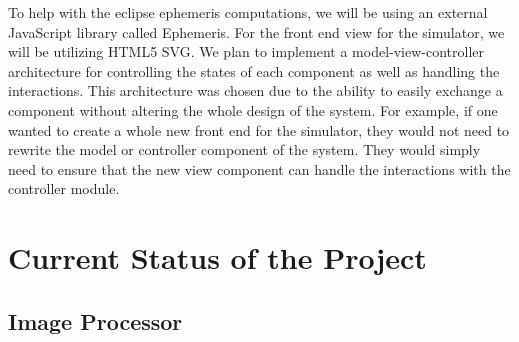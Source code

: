 \documentclass[10pt, onecolumn, draftclsnofoot, letterpaper, compsoc]{IEEEtran}
\begin{document}
To help with the eclipse ephemeris computations, we will be using an external
JavaScript library called Ephemeris. For the front end view for the simulator,
we will be utilizing HTML5 SVG. We plan to implement a model-view-controller
architecture for controlling the states of each component as well as handling
the interactions. This architecture was chosen due to the ability to easily
exchange a component without altering the whole design of the system. For
example, if one wanted to create a whole new front end for the simulator,
they would not need to rewrite the model or controller component of the system.
They would simply need to ensure that the new view component can handle the
interactions with the controller module.


\section{Current Status of the Project}


\subsection{Image Processor}


\end{document}
